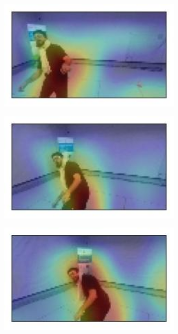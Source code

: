 \begin{figure}[!h]
	\begin{center}
		\begin{subfigure}[h]{0.24\textwidth}
			\centering
			\includegraphics[width=1\textwidth]{"contents/images/gradcam/gradcam-beard-01"}
		\end{subfigure}
		\hfill
		\begin{subfigure}[h]{0.24\textwidth}
			\centering
			\includegraphics[width=1\textwidth]{"contents/images/gradcam/gradcam-beard-02"}
		\end{subfigure}
		\hfill
		\begin{subfigure}[h]{0.24\textwidth}
			\centering
			\includegraphics[width=1\textwidth]{"contents/images/gradcam/gradcam-beard-03"}

\end{subfigure}
\end{center}
\end{figure}
